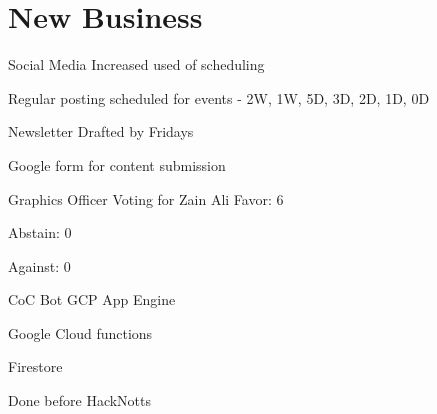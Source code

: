 \documentclass[11pt,hacksoc]{meetingmins}
\begin{document}
\section{New Business}
\begin{items}
	\item
	Social Media
		\subitem
		Increased used of scheduling
		
		\subitem
		Regular posting scheduled for events - 2W, 1W, 5D, 3D, 2D, 1D, 0D
		
	\item
	Newsletter
		\subitem
		Drafted by Fridays
		
		\subitem
		Google form for content submission
		
	\item
	Graphics Officer
		\subitem
		Voting for Zain Ali
			\subsubitem
			Favor: 6
			
			\subsubitem
			Abstain: 0
			
			\subsubitem
			Against: 0
			
	\item
	CoC Bot
		\subitem
		GCP App Engine
		
		\subitem
		Google Cloud functions
		
		\subitem
		Firestore
		
		\subitem
		Done before HackNotts
	
\end{items}

\vspace{1em}
\end{document}
